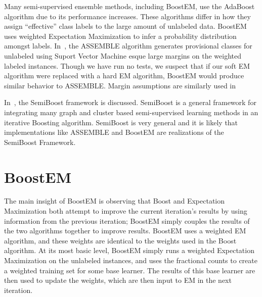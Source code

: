 \documentclass{sig-alternate}
\begin{document}
Many semi-supervised ensemble methods, including BoostEM, use the AdaBoost algorithm due to its performance increases. These algorithms differ in how they assign ``effective'' class labels to the large amount of unlabeled data.  BoostEM uses weighted Expectation Maximization to infer a probability distribution amongst labels. In~\cite{bennett2002exploiting}, the ASSEMBLE algorithm generates provisional classes for unlabeled using Suport Vector Machine esque large margins on the weighted labeled instances.  Though we have run no tests, we suspect that if our soft EM algorithm were replaced with a hard EM algorithm, BoostEM would produce similar behavior to ASSEMBLE. Margin assumptions are similarly used in~\cite{grandvalet2001semi}

In~\cite{kumar2009semiboost}, the SemiBoost framework is discussed. SemiBoost is a general framework for integrating many graph and cluster based semi-supervised learning methods in an iterative Boosting algorithm.  SemiBoost is very general and it is likely that implementations like ASSEMBLE and BoostEM are realizations of the SemiBoost Framework.  



\section{BoostEM}
The main insight of BoostEM is observing that Boost and Expectation Maximization both attempt to improve the current iteration's results by using information from the previous iteration; BoostEM simply couples the results of the two algorithms together to improve results.  BoostEM uses a weighted EM algorithm, and these weights are identical to the weights used in the Boost algorithm.  At its most basic level, BoostEM simply runs a weighted Expectation Maximization on the unlabeled instances, and uses the fractional counts to create a weighted training set for some base learner.  The results of this base learner are then used to update the weights, which are then input to EM in the next iteration. 
\end{document}
